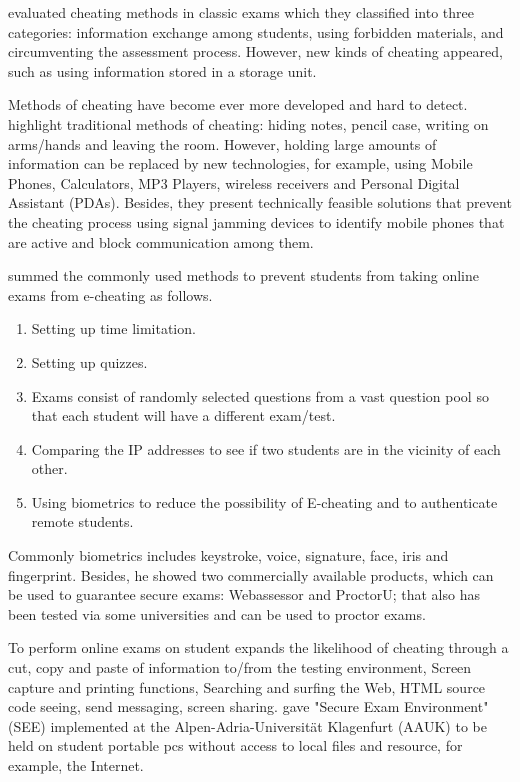  evaluated cheating methods in classic exams which they classified into three categories: information exchange among students, using forbidden materials, and circumventing the assessment process.
However, new kinds of cheating appeared, such as using information stored in a storage unit.

Methods of cheating have become ever more developed and hard to detect.
 highlight traditional methods of cheating: hiding notes, pencil case, writing on arms/hands and leaving the room.
However, holding large amounts of information can be replaced by new technologies, for example, using Mobile Phones, Calculators, MP3 Players, wireless receivers and Personal Digital Assistant (PDAs).
Besides, they present technically feasible solutions that prevent the cheating process using signal jamming devices to identify mobile phones that are active and block communication among them.

 summed the commonly used methods to prevent students from taking online exams from e-cheating as follows.

\begin{enumerate}
    \item Setting up time limitation.
    \item Setting up quizzes.
    \item Exams consist of randomly selected questions from a vast question pool so that each student will have a different exam/test.
    \item Comparing the IP addresses to see if two students are in the vicinity of each other.
    \item Using biometrics to reduce the possibility of E-cheating and to authenticate remote students.
\end{enumerate}

Commonly biometrics includes keystroke, voice, signature, face, iris and fingerprint.
Besides, he showed two commercially available products, which can be used to guarantee secure exams: Webassessor and ProctorU; that also has been tested via some universities and can be used to proctor exams.

To perform online exams on student expands the likelihood of cheating through a cut, copy and paste of information to/from the testing environment, Screen capture and printing functions, Searching and surfing the Web, HTML source code seeing, send messaging, screen sharing.
 gave "Secure Exam Environment" (SEE) implemented at the Alpen-Adria-Universität Klagenfurt (AAUK) to be held on student portable pcs without access to local files and resource, for example, the Internet.

